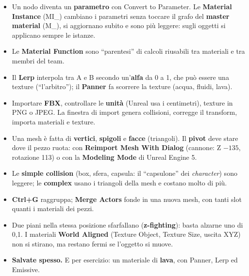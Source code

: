 \begin{itemize}
        quante volte si ripete la texture: 2 e 2 sono quattro ripetizioni, 0,5 e 0,5 un
        quarto della texture.
  \item Un nodo diventa un \textbf{parametro} con Convert to Parameter. Le
        \textbf{Material Instance} (MI\_) cambiano i parametri senza toccare il grafo
        del \textbf{master material} (M\_), si aggiornano subito e sono più leggere:
        sugli oggetti si applicano sempre le istanze.
  \item Le \textbf{Material Function} sono ``parentesi'' di calcoli riusabili tra
        materiali e tra membri del team.
  \item Il \textbf{Lerp} interpola tra A e B secondo un'\textbf{alfa} da 0 a 1, che può
        essere una texture (``l'arbitro''); il \textbf{Panner} fa scorrere la texture
        (acqua, fluidi, lava).
  \item Importare \textbf{FBX}, controllare le \textbf{unità} (Unreal usa i
        centimetri), texture in PNG o JPEG. La finestra di import genera collisioni,
        corregge il transform, importa materiali e texture.
  \item Una mesh è fatta di \textbf{vertici}, \textbf{spigoli} e \textbf{facce}
        (triangoli). Il \textbf{pivot} deve stare dove il pezzo ruota: con
        \textbf{Reimport Mesh With Dialog} (cannone: Z $-135$, rotazione 113) o con la
        \textbf{Modeling Mode} di Unreal Engine 5.
  \item Le \textbf{simple collision} (box, sfera, capsula: il ``capsulone'' dei
        \emph{character}) sono leggere; le \textbf{complex} usano i triangoli della mesh
        e costano molto di più.
  \item \textbf{Ctrl+G} raggruppa; \textbf{Merge Actors} fonde in una nuova mesh, con
        tanti slot quanti i materiali dei pezzi.
  \item Due piani nella stessa posizione sfarfallano (\textbf{z-fighting}): basta
        alzarne uno di 0,1. I materiali \textbf{World Aligned} (Texture Object, Texture
        Size, uscita XYZ) non si stirano, ma restano fermi se l'oggetto si muove.
  \item \textbf{Salvate spesso.} E per esercizio: un materiale di \textbf{lava}, con
        Panner, Lerp ed Emissive.
\end{itemize}
